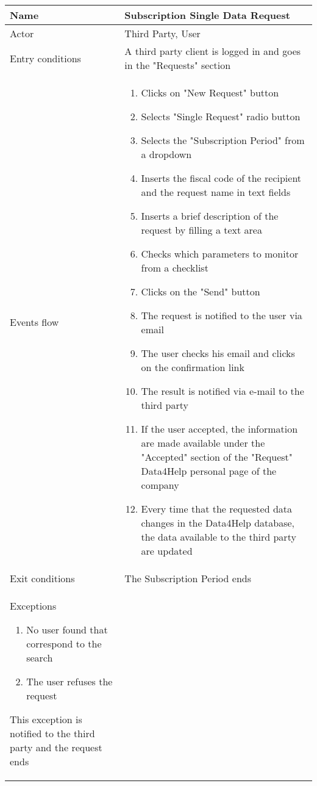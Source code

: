 \begin{table}[]
\begin{tabular}{|l|p{12cm}|}
\hline
Name             & Subscription Single Data Request \\ \hline
Actor            & Third Party, User \\ \hline
Entry conditions & A third party client is logged in and goes in the "Requests" section\\ \hline
Events flow      & \begin{enumerate}
\item Clicks on "New Request" button
\item Selects "Single Request" radio button
\item Selects the "Subscription Period" from a dropdown
\item Inserts the fiscal code of the recipient and the request name in text fields
\item Inserts a brief description of the request by filling a text area
\item Checks which parameters to monitor from a checklist
\item Clicks on the "Send" button
\item The request is notified to the user via email
\item The user checks his email and clicks on the confirmation link
\item The result is notified via e-mail to the third party
\item If the user accepted, the information are made available under the "Accepted" section of the "Request" Data4Help personal page of the company
\item Every time that the requested data changes in the Data4Help database, the data available to the third party are updated
\end{enumerate} \\ \hline
Exit conditions  & The Subscription Period ends \\ \hline
Exceptions \begin{enumerate}
\item No user found that correspond to the search
\item The user refuses the request
\end{enumerate} This exception is notified to the third party and the request ends\\  \hline
\end{tabular}
\end{table}

